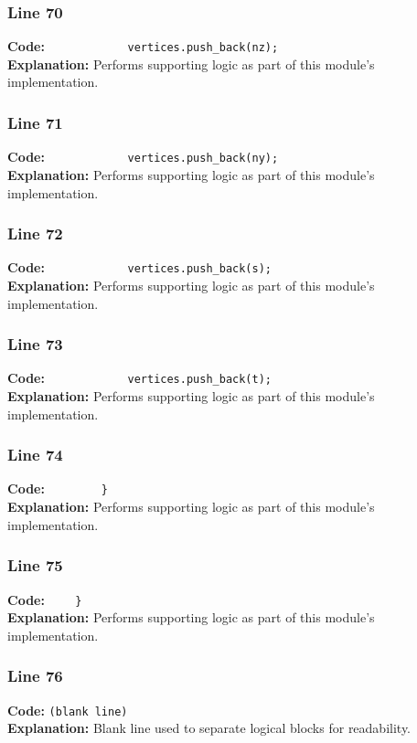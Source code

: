 \documentclass[11pt,a4paper]{article}
\begin{document}
\subsubsection*{Line 70}
\textbf{Code:} \verb|            vertices.push_back(nz);|\\
\textbf{Explanation:} Performs supporting logic as part of this module's implementation.

\subsubsection*{Line 71}
\textbf{Code:} \verb|            vertices.push_back(ny);|\\
\textbf{Explanation:} Performs supporting logic as part of this module's implementation.

\subsubsection*{Line 72}
\textbf{Code:} \verb|            vertices.push_back(s);|\\
\textbf{Explanation:} Performs supporting logic as part of this module's implementation.

\subsubsection*{Line 73}
\textbf{Code:} \verb|            vertices.push_back(t);|\\
\textbf{Explanation:} Performs supporting logic as part of this module's implementation.

\subsubsection*{Line 74}
\textbf{Code:} \verb|        }|\\
\textbf{Explanation:} Performs supporting logic as part of this module's implementation.

\subsubsection*{Line 75}
\textbf{Code:} \verb|    }|\\
\textbf{Explanation:} Performs supporting logic as part of this module's implementation.

\subsubsection*{Line 76}
\textbf{Code:} \texttt{(blank line)}\\
\textbf{Explanation:} Blank line used to separate logical blocks for readability.
\end{document}
